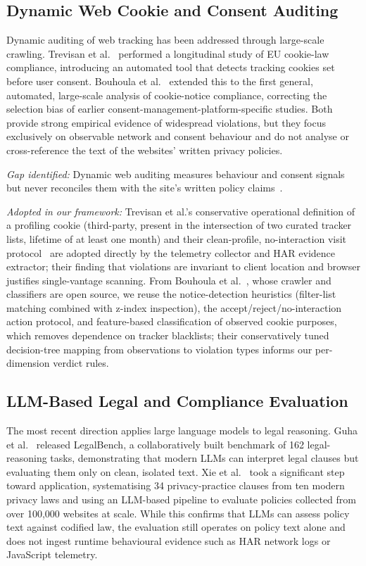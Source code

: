 \documentclass[conference]{IEEEtran}
\begin{document}
\subsection{Dynamic Web Cookie and Consent Auditing}
Dynamic auditing of web tracking has been addressed through large-scale crawling. Trevisan et al.~\cite{trevisan-2019-cookielaw} performed a longitudinal study of EU cookie-law compliance, introducing an automated tool that detects tracking cookies set before user consent. Bouhoula et al.~\cite{bouhoula-2024-cookies} extended this to the first general, automated, large-scale analysis of cookie-notice compliance, correcting the selection bias of earlier consent-management-platform-specific studies. Both provide strong empirical evidence of widespread violations, but they focus exclusively on observable network and consent behaviour and do not analyse or cross-reference the text of the websites' written privacy policies.

\noindent\textit{Gap identified:} Dynamic web auditing measures behaviour and consent signals but never reconciles them with the site's written policy claims~\cite{trevisan-2019-cookielaw,bouhoula-2024-cookies}.

\noindent\textit{Adopted in our framework:} Trevisan et al.'s conservative operational definition of a profiling cookie (third-party, present in the intersection of two curated tracker lists, lifetime of at least one month) and their clean-profile, no-interaction visit protocol~\cite{trevisan-2019-cookielaw} are adopted directly by the telemetry collector and HAR evidence extractor; their finding that violations are invariant to client location and browser justifies single-vantage scanning. From Bouhoula et al.~\cite{bouhoula-2024-cookies}, whose crawler and classifiers are open source, we reuse the notice-detection heuristics (filter-list matching combined with z-index inspection), the accept/reject/no-interaction action protocol, and feature-based classification of observed cookie purposes, which removes dependence on tracker blacklists; their conservatively tuned decision-tree mapping from observations to violation types informs our per-dimension verdict rules.

\subsection{LLM-Based Legal and Compliance Evaluation}
The most recent direction applies large language models to legal reasoning. Guha et al.~\cite{guha-2023-legalbench} released LegalBench, a collaboratively built benchmark of 162 legal-reasoning tasks, demonstrating that modern LLMs can interpret legal clauses but evaluating them only on clean, isolated text. Xie et al.~\cite{xie-2025-llmpolicy} took a significant step toward application, systematising 34 privacy-practice clauses from ten modern privacy laws and using an LLM-based pipeline to evaluate policies collected from over 100,000 websites at scale. While this confirms that LLMs can assess policy text against codified law, the evaluation still operates on policy text alone and does not ingest runtime behavioural evidence such as HAR network logs or JavaScript telemetry.
\end{document}
